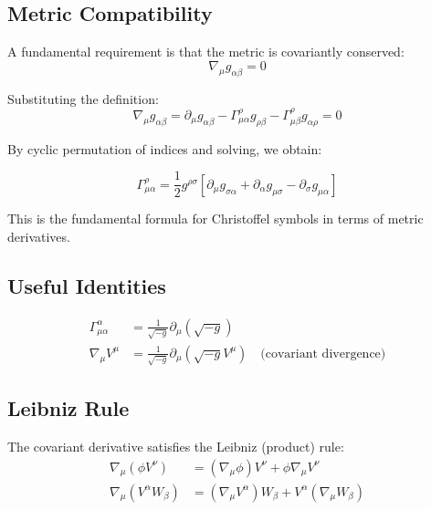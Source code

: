 \documentclass[11pt,a4paper]{article}
\begin{document}
\subsection{Metric Compatibility}

A fundamental requirement is that the metric is covariantly conserved:
\begin{equation}
\boxed{\nabla_\mu g_{\alpha\beta} = 0}
\end{equation}

Substituting the definition:
\begin{equation}
\nabla_\mu g_{\alpha\beta} = \partial_\mu g_{\alpha\beta} - \Gamma^\rho_{\mu\alpha} g_{\rho\beta} - \Gamma^\rho_{\mu\beta} g_{\alpha\rho} = 0
\end{equation}

By cyclic permutation of indices and solving, we obtain:

\begin{equation}
\boxed{\Gamma^\rho_{\mu\alpha} = \frac{1}{2} g^{\rho\sigma} \left[\partial_\mu g_{\sigma\alpha} + \partial_\alpha g_{\mu\sigma} - \partial_\sigma g_{\mu\alpha}\right]}
\end{equation}

This is the fundamental formula for Christoffel symbols in terms of metric derivatives.

\subsection{Useful Identities}

\begin{align}
\Gamma^\alpha_{\mu\alpha} &= \frac{1}{\sqrt{-g}} \partial_\mu (\sqrt{-g}) \\
\nabla_\mu V^\mu &= \frac{1}{\sqrt{-g}} \partial_\mu (\sqrt{-g} V^\mu) \quad \text{(covariant divergence)}
\end{align}

\subsection{Leibniz Rule}

The covariant derivative satisfies the Leibniz (product) rule:
\begin{align}
\nabla_\mu (\phi V^\nu) &= (\nabla_\mu \phi) V^\nu + \phi \nabla_\mu V^\nu \\
\nabla_\mu (V^\alpha W_\beta) &= (\nabla_\mu V^\alpha) W_\beta + V^\alpha (\nabla_\mu W_\beta)
\end{align}
\end{document}
